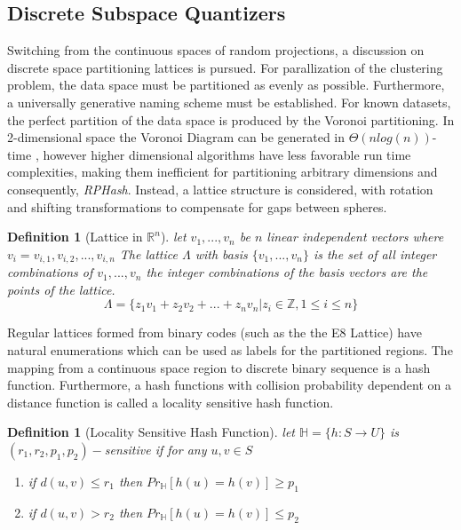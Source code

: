 \documentclass[a4paper,10pt]{article}
\newtheorem{Definition}[Theorem]{Definition}
\begin{document}
\subsection{Discrete Subspace Quantizers} Switching from the continuous spaces
of random projections, a discussion on discrete space partitioning lattices
is pursued.  For parallization of the clustering problem, the data space must
be partitioned as evenly as possible.  Furthermore, a universally generative
naming scheme must be established.  For known datasets, the perfect partition
of the data space is produced by the Voronoi partitioning\cite{Klein1988}.
In 2-dimensional space the Voronoi Diagram can be generated in $\Theta(n
log(n))$-time \cite{Fortune}, however higher dimensional algorithms
have less favorable run time complexities\cite{Gavrilova2003}, making
them inefficient for partitioning arbitrary dimensions and consequently,
\emph{RPHash}.	Instead, a lattice structure is considered, with rotation
and shifting transformations to compensate for gaps between spheres.
\begin{Definition}[Lattice in $\mathbb{R}^n$\cite{Pless}]
let $v_1, ...  , v_n$ be $n$ linear independent vectors where $v_i=v_{i,1}, 
v_{i,2}, ...  ,v_{i,n}$ 
The lattice $\Lambda$ with basis $\{v_1, ...  , v_n\}$ is the set of all 
integer combinations of $v_1, ...  , v_n$
the integer combinations of the basis vectors are the points of the lattice.
$$\Lambda = \{z_1v_1+z_2v_2+ ...  +z_nv_n | z_i\in \mathbb{Z}, 1 \leq i \leq 
n\}$$
\end{Definition}
Regular lattices formed from binary codes (such as the the E8 Lattice) have
natural enumerations which can be used as labels for the partitioned regions.
The mapping from a continuous space region to discrete binary sequence is a
hash function.	Furthermore, a hash functions with collision probability
dependent on a distance function is called a locality sensitive hash
function.
\begin{Definition}[Locality Sensitive Hash Function\cite{Datar}]
let $\mathbb{H}=\{h:S \rightarrow U\}$ is $(r_1,r_2,p_1,p_2)-$sensitive if for 
any $u,v\in S$
 \begin{enumerate}
   \item if $d(u,v) \leq r_1$ then $Pr_{\mathbb{H}}[h(u)=h(v)]\geq p_1$
   \item if $d(u,v) > r_2$ then $Pr_{\mathbb{H}}[h(u)=h(v)]\leq p_2$
 \end{enumerate}
\end{Definition}
\end{document}
